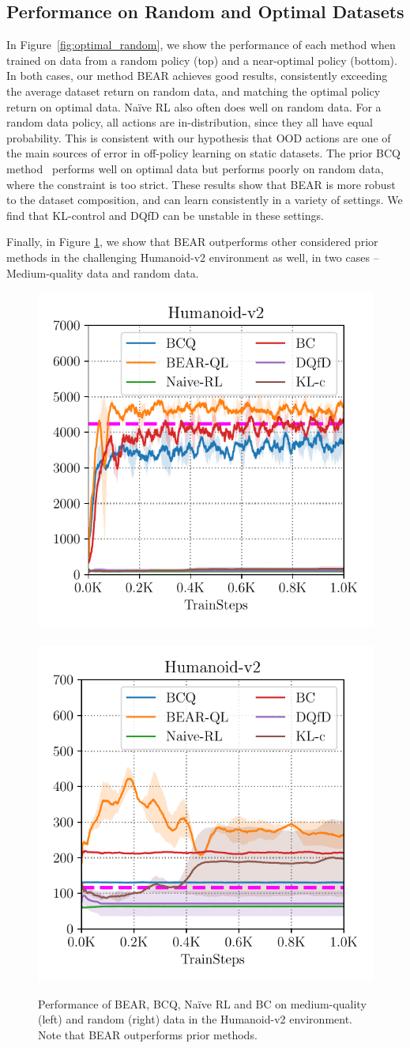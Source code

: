 \subsection{Performance on Random and Optimal Datasets}
In Figure~\ref{fig:optimal_random}, we show the performance of each method when trained on data from a random policy (top) and a near-optimal policy (bottom). In both cases, our method BEAR achieves good results, consistently exceeding the average dataset return on random data, and matching the optimal policy return on optimal data. Na\"{i}ve RL also often does well on random data. For a random data policy, all actions are in-distribution, since they all have equal probability. This is consistent with our hypothesis that OOD actions are one of the main sources of error in off-policy learning on static datasets. The prior BCQ method~\cite{fujimoto2018off} performs well on optimal data but performs poorly on random data, where the constraint is too strict. These results show that BEAR is more robust to the dataset composition, and can learn consistently in a variety of settings. We find that KL-control and DQfD can be unstable in these settings.  

{Finally, in Figure \ref{fig:humanoid}, we  show that BEAR outperforms other considered prior methods in the challenging Humanoid-v2 environment as well, in two cases -- Medium-quality data and random data.}

\begin{figure}
        \centering
        \includegraphics[width=0.4\linewidth]{chapters/bear/images/images_camera_ready/humanoid_mediocre_camera_ready.pdf}
       ~
        \includegraphics[width=0.4\linewidth]{chapters/bear/images/images_camera_ready/humanoid_random_camera_ready.pdf}
      \caption{\label{fig:humanoid} \footnotesize Performance of BEAR, BCQ, Na\"ive RL and BC on medium-quality (left) and random (right) data in the Humanoid-v2 environment. Note that BEAR outperforms prior methods.}
\end{figure}

